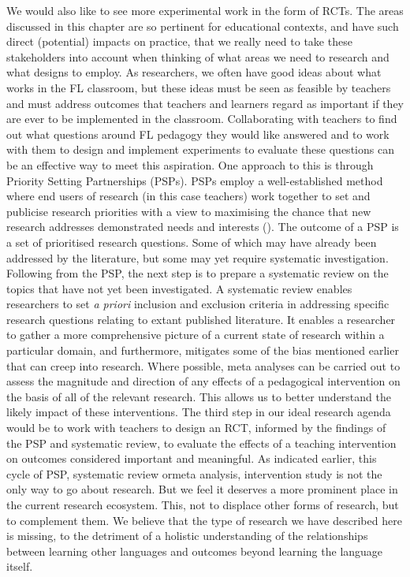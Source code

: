 \documentclass[output=paper]{langscibook}
\begin{document}
We would also like to see more experimental work in the form of RCTs. The areas discussed in this chapter are so pertinent for educational contexts, and have such direct (potential) impacts on practice, that we really need to take these stakeholders into account when thinking of what areas we need to research and what designs to employ. As researchers, we often have good ideas about what works in the FL classroom, but these ideas must be seen as feasible by teachers and must address outcomes that teachers and learners regard as important if they are ever to be implemented in the classroom. Collaborating with teachers to find out what questions around FL pedagogy they would like answered and to work with them to design and implement experiments to evaluate these questions can be an effective way to meet this aspiration. One approach to this is through Priority Setting Partnerships (PSPs). PSPs employ a well-established method where end users of research (in this case teachers) work together to set and publicise research priorities with a view to maximising the chance that new research addresses demonstrated needs and interests (\citealt{StaleyCrowe2019,ChalmersEtAl2021}). The outcome of a PSP is a set of prioritised research questions. Some of which may have already been addressed by the literature, but some may yet require systematic investigation. Following from the PSP, the next step is to prepare a systematic review on the topics that have not yet been investigated. A systematic review enables researchers to set \textit{a priori} inclusion and exclusion criteria in addressing specific research questions relating to extant published literature. It enables a researcher to gather a more comprehensive picture of a current state of research within a particular domain, and furthermore, mitigates some of the bias mentioned earlier that can creep into research. Where possible, meta analyses can be carried out to assess the magnitude and direction of any effects of a pedagogical intervention on the basis of all of the relevant research. This allows us to better understand the likely impact of these interventions. The third step in our ideal research agenda would be to work with teachers to design an RCT, informed by the findings of the PSP and systematic review, to evaluate the effects of a teaching intervention on outcomes considered important and meaningful. As indicated earlier, this cycle of PSP, systematic review ormeta analysis, intervention study is not the only way to go about research. But we feel it deserves a more prominent place in the current research ecosystem. This, not to displace other forms of research, but to complement them. We believe that the type of research we have described here is missing, to the detriment of a holistic understanding of the relationships between learning other languages and outcomes beyond learning the language itself.
\end{document}
